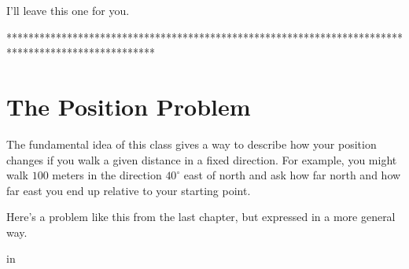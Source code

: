 \documentclass{ximera}
\newcommand{\pskip}{\vskip 0.1 in}
\begin{document}



I'll leave this one for you.


\iffalse

***************************************************************************************************

\section{The Position Problem}

The fundamental idea of this class gives a way to describe how your position changes if you walk a given distance in a fixed direction. For example, you might walk $100$ meters in the direction $40^\circ$ east of north and ask how far north and how far east you end up relative to your starting point.

Here's a problem like this from the last chapter, but expressed in a more general way.

\pskip
\end{document}
